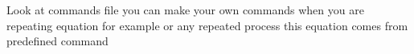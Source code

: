 Look at commands file you can make your own commands when you are repeating equation for example or any repeated process 
this equation comes from predefined command
\komyCommand